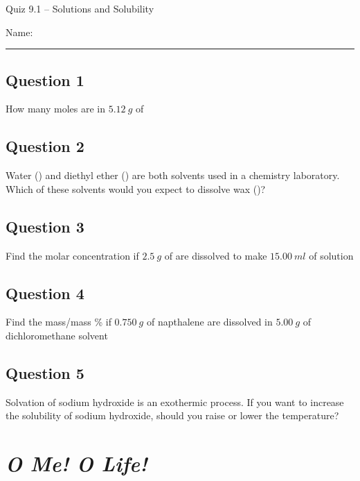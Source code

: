 \documentclass[11pt, letterpaper]{memoir}
\begin{document}
	\begin{center}
		{\large Quiz 9.1 --	Solutions and Solubility}
	\end{center}
	{\large Name: \rule[-1mm]{4in}{.1pt} 

\subsection*{Question 1}
How many moles are in $5.12~g$ of 

\vspace{5em}
\subsection*{Question 2}
Water () and diethyl ether () are both solvents used in a chemistry laboratory.\\Which of these solvents would you expect to dissolve wax ()?

\vspace{5em}
\subsection*{Question 3}
Find the molar concentration if $2.5~g$ of  are dissolved to make $15.00~ml$ of solution

\vspace{8em}
\subsection*{Question 4}
Find the mass/mass \% if $0.750~g$ of napthalene are dissolved in $5.00~g$ of dichloromethane solvent


\vspace{8em}
\subsection*{Question 5}
Solvation of sodium hydroxide is an exothermic process. If you want to increase the solubility of sodium hydroxide, should you raise or lower the temperature?
\newpage
{}
\pagestyle{empty}
\addtocounter{page}{-1}
\section*{\emph{O Me! O Life!}}
}
\end{document}

